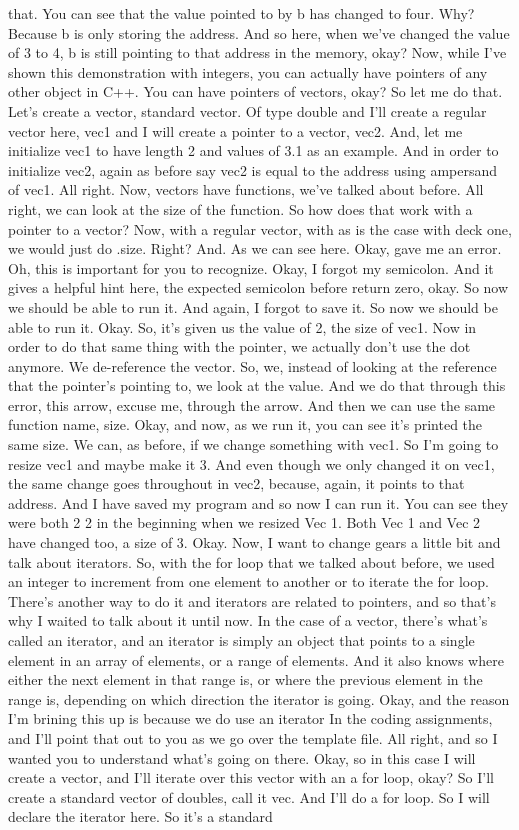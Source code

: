 \documentclass[10pt]{article}
\begin{document}
that. You can see that the value pointed to by b has changed to four. Why? Because b is only storing the address. And so here, when we've changed the value of 3 to 4, b is still pointing to that address in the memory, okay? Now, while I've shown this demonstration with integers, you can actually have pointers of any other object in C++. You can have pointers of vectors, okay? So let me do that. Let's create a vector, standard vector. Of type double and I'll create a regular vector here, vec1 and I will create a pointer to a vector, vec2. And, let me initialize vec1 to have length 2 and values of 3.1 as an example. And in order to initialize vec2, again as before say vec2 is equal to the address using ampersand of vec1. All right. Now, vectors have functions, we've talked about before. All right, we can look at the size of the function. So how does that work with a pointer to a vector? Now, with a regular vector, with as is the case with deck one, we would just do .size. Right? And. As we can see here. Okay, gave me an error. Oh, this is important for you to recognize. Okay, I forgot my semicolon. And it gives a helpful hint here, the expected semicolon before return zero, okay. So now we should be able to run it. And again, I forgot to save it. So now we should be able to run it. Okay. So, it's given us the value of 2, the size of vec1. Now in order to do that same thing with the pointer, we actually don't use the dot anymore. We de-reference the vector. So, we, instead of looking at the reference that the pointer's pointing to, we look at the value. And we do that through this error, this arrow, excuse me, through the arrow. And then we can use the same function name, size. Okay, and now, as we run it, you can see it's printed the same size. We can, as before, if we change something with vec1. So I'm going to resize vec1 and maybe make it 3. And even though we only changed it on vec1, the same change goes throughout in vec2, because, again, it points to that address. And I have saved my program and so now I can run it. You can see they were both 2 2 in the beginning when we resized Vec 1. Both Vec 1 and Vec 2 have changed too, a size of 3. Okay. Now, I want to change gears a little bit and talk about iterators. So, with the for loop that we talked about before, we used an integer to increment from one element to another or to iterate the for loop. There's another way to do it and iterators are related to pointers, and so that's why I waited to talk about it until now. In the case of a vector, there's what's called an iterator, and an iterator is simply an object that points to a single element in an array of elements, or a range of elements. And it also knows where either the next element in that range is, or where the previous element in the range is, depending on which direction the iterator is going. Okay, and the reason I'm brining this up is because we do use an iterator In the coding assignments, and I'll point that out to you as we go over the template file. All right, and so I wanted you to understand what's going on there. Okay, so in this case I will create a vector, and I'll iterate over this vector with an a for loop, okay? So I'll create a standard vector of doubles, call it vec. And I'll do a for loop. So I will declare the iterator here. So it's a standard 
\end{document}

